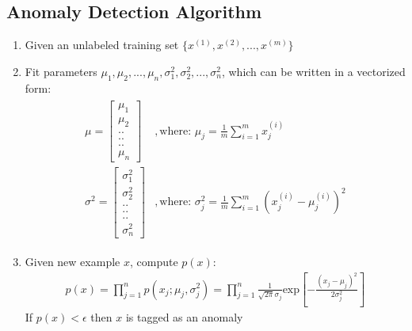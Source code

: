 \documentclass[a4paper,12pt]{report}
\begin{document}
\subsection{Anomaly Detection Algorithm}
\begin{enumerate}
\item Given an unlabeled training set $\{x^{(1)}, x^{(2)}, ..., x^{(m)}  \}$
\item Fit parameters $\mu_1, \mu_2, ..., \mu_n, \sigma_1 ^2, \sigma_2 ^2,..., \sigma_n ^2$, which can be written in a vectorized form:
\begin{align}
\begin{split}
\mu = \left[ \begin{smallmatrix} \mu_1 \\ \mu_2 \\ ..\\..\\..\\ \mu_n \end{smallmatrix} \right] & ,\text{where: \ }  \mu_j= \frac{1}{m} \sum _{i=1} ^m x_j ^{(i)} \\
\sigma ^2 = \left[ \begin{smallmatrix} \sigma_1 ^2 \\ \sigma_2 ^2 \\ ..\\..\\..\\ \sigma_n ^2 \end{smallmatrix} \right] & , \text{where: \ } \sigma_j ^2 = \frac{1}{m} \sum _{i=1} ^m (x_j ^{(i)} - \mu_j ^{(i)})^2
\end{split}
\end{align}
\item Given new example $x$, compute $p(x)$:
\begin{align}
p(x) = \prod_{j=1} ^n p(x_j; \mu_j, \sigma_j ^2) = \prod_{j=1} ^n \frac{1}{\sqrt{2 \pi} \sigma_j} \text{exp} \left[ -\frac{(x_j-\mu_j)^2}{2 \sigma_j ^2} \right]
\end{align}
If $p(x) < \epsilon $ then $x$ is tagged as an anomaly
\end{enumerate}
\end{document}

